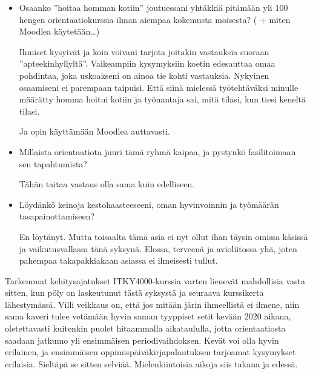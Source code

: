 \documentclass[utf8]{gradu3}
\begin{document}
\begin{itemize}
  \item Osaanko ”hoitaa homman kotiin” joutuessani yhtäkkiä pitämään yli
        100 hengen orientaatiokurssia ilman aiempaa kokemusta moisesta? ( +
        miten Moodlea käytetään…)

        Ihmiset kysyivät ja koin voivani tarjota joitakin vastauksia suoraan
        ''apteekinhyllyltä''. Vaikeampiin kysymyksiin koetin edesauttaa omaa
        pohdintaa, joka uskoakseni on ainoa tie kohti vastauksia. Nykyinen
        osaamiseni ei parempaan taipuisi. Että siinä mielessä työtehtäväksi
        minulle määrätty homma hoitui kotiin ja työnantaja sai, mitä tilasi,
        kun tiesi keneltä tilasi.

        Ja opin käyttämään Moodlea auttavasti.

  \item Millaista orientaatiota juuri tämä ryhmä kaipaa, ja pystynkö
        fasilitoimaan sen tapahtumista?

        Tähän taitaa vastaus olla sama kuin edelliseen.

  \item Löydänkö keinoja kestohaasteeseeni, oman hyvinvoinnin ja
        työmäärän tasapainottamiseen?

        En löytänyt. Mutta toisaalta tämä asia ei nyt ollut ihan täysin
        omissa käsissä ja vaikutusvallassa tänä syksynä. Elossa, terveenä ja
        avioliitossa yhä, joten pahempaa takapakkiakaan asiassa ei
        ilmeisesti tullut.
\end{itemize}


Tarkemmat kehitysajatukset ITKY4000-kurssia varten lienevät
mahdollisia vasta sitten, kun pöly on laskeutunut tästä syksystä ja
seuraava kurssikerta lähestymässä. Villi veikkaus on, että jos mitään
järin ihmeellistä ei ilmene, niin sama kaveri tulee vetämään hyvin
saman tyyppiset setit kevään 2020 aikana, oletettavasti kuitenkin
puolet hitaammalla aikataululla, jotta orientaatiosta saadaan jatkumo
yli ensimmäisen periodivaihdoksen. Kevät voi olla hyvin erilainen, ja
ensimmäisen oppimispäiväkirjapalautuksen tarjoamat kysymykset
erilaisia. Sieltäpä se sitten selviää. Mielenkiintoisia aikoja siis
takana ja edessä.

\printbibliography
\end{document}

